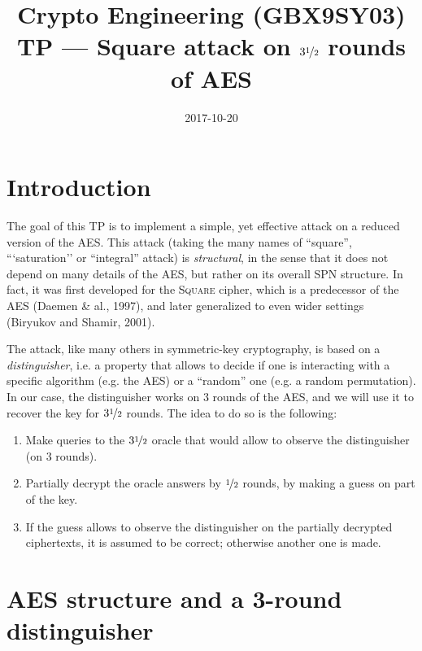 \documentclass[a4paper,11pt]{article}
\title{Crypto Engineering (GBX9SY03)\\
TP --- Square attack on $3\nicefrac{1}{2}$ rounds of AES}
\date{2017-10-20}
\begin{document}
\maketitle{}

\section*{Introduction}

The goal of this TP is to implement a simple, yet effective attack on a reduced version of the AES. This attack (taking the many names of
``square'', ```saturation'' or ``integral'' attack) is \emph{structural}, in the sense that it does not depend on many details of the AES,
but rather on its overall SPN structure. In fact, it was first developed for the \textsc{Square} cipher, which is a predecessor
of the AES (Daemen \& al., 1997), and later generalized to even wider settings (Biryukov and Shamir, 2001).

The attack, like many others in symmetric-key cryptography, is based on a \emph{distinguisher}, i.e. a property that allows to decide if
one is interacting with a specific algorithm (e.g. the AES) or a ``random'' one (e.g. a random permutation). In our case, the distinguisher
works on $3$ rounds of the AES, and we will use it to recover the key for $3\nicefrac{1}{2}$ rounds. The idea to do so is the following:
\begin{enumerate}
\item Make queries to the $3\nicefrac{1}{2}$ oracle that would allow to observe the distinguisher (on $3$ rounds).
\item Partially decrypt the oracle answers by $\nicefrac{1}{2}$ rounds, by making a guess on part of the key.
\item If the guess allows to observe the distinguisher on the partially decrypted ciphertexts, it is assumed to be correct; otherwise another one is made.
\end{enumerate}

\section*{AES structure and a 3-round distinguisher}
\end{document}
